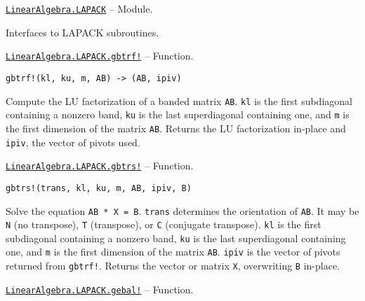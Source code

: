 \hypertarget{5713679047114421298}{} 
\hyperlink{5713679047114421298}{\texttt{LinearAlgebra.LAPACK}}  -- {Module.}

\begin{adjustwidth}{2em}{0pt}

Interfaces to LAPACK subroutines.



\end{adjustwidth}
\hypertarget{4626964766607452194}{} 
\hyperlink{4626964766607452194}{\texttt{LinearAlgebra.LAPACK.gbtrf!}}  -- {Function.}

\begin{adjustwidth}{2em}{0pt}


\begin{verbatim}
gbtrf!(kl, ku, m, AB) -> (AB, ipiv)
\end{verbatim}

Compute the LU factorization of a banded matrix \texttt{AB}. \texttt{kl} is the first subdiagonal containing a nonzero band, \texttt{ku} is the last superdiagonal containing one, and \texttt{m} is the first dimension of the matrix \texttt{AB}. Returns the LU factorization in-place and \texttt{ipiv}, the vector of pivots used.



\end{adjustwidth}
\hypertarget{6545699816764482655}{} 
\hyperlink{6545699816764482655}{\texttt{LinearAlgebra.LAPACK.gbtrs!}}  -- {Function.}

\begin{adjustwidth}{2em}{0pt}


\begin{verbatim}
gbtrs!(trans, kl, ku, m, AB, ipiv, B)
\end{verbatim}

Solve the equation \texttt{AB * X = B}. \texttt{trans} determines the orientation of \texttt{AB}. It may be \texttt{N} (no transpose), \texttt{T} (transpose), or \texttt{C} (conjugate transpose). \texttt{kl} is the first subdiagonal containing a nonzero band, \texttt{ku} is the last superdiagonal containing one, and \texttt{m} is the first dimension of the matrix \texttt{AB}. \texttt{ipiv} is the vector of pivots returned from \texttt{gbtrf!}. Returns the vector or matrix \texttt{X}, overwriting \texttt{B} in-place.



\end{adjustwidth}
\hypertarget{16195720455630892558}{} 
\hyperlink{16195720455630892558}{\texttt{LinearAlgebra.LAPACK.gebal!}}  -- {Function.}

